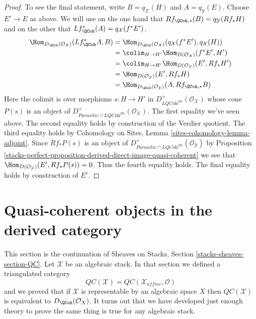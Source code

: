 \begin{proof}
\medskip\noindent
To see the final statement, write $B = q_\mathcal{X}(H)$ and
$A = q_\mathcal{Y}(E)$.
Choose $E' \to E$ as above.
We will use on the one hand that
$Rf_{\QCoh, *}(B) = q_\mathcal{Y}(Rf_*H)$
and on the other that
$Lf^*_\QCoh(A) = q_\mathcal{X}(f^*E')$.
\begin{align*}
\Hom_{D_\QCoh(\mathcal{O}_\mathcal{X})}(Lf^*_\QCoh A, B)
& =
\Hom_{D_\QCoh(\mathcal{O}_\mathcal{X})}(q_\mathcal{X}(f^*E'),
q_\mathcal{X}(H)) \\
& =
\colim_{H \to H'} \Hom_{D(\mathcal{O}_\mathcal{X})}(f^*E', H') \\
& = \colim_{H \to H'} \Hom_{D(\mathcal{O}_\mathcal{Y})}(E', Rf_*H') \\
& = \Hom_{D(\mathcal{O}_\mathcal{Y})}(E', Rf_*H) \\
& =
\Hom_{D_\QCoh(\mathcal{O}_\mathcal{Y})}(A, Rf_{\QCoh, *}B)
\end{align*}
Here the colimit is over morphisms $s : H \to H'$ in
$D^+_{\textit{LQCoh}^{fbc}}(\mathcal{O}_\mathcal{X})$
whose cone $P(s)$ is an object of
$D^+_{\textit{Parasitic} \cap \textit{LQCoh}^{fbc}}(\mathcal{O}_\mathcal{X})$.
The first equality we've seen above.
The second equality holds by construction of the Verdier quotient.
The third equality holds by
Cohomology on Sites, Lemma \ref{sites-cohomology-lemma-adjoint}.
Since $Rf_*P(s)$ is an object of
$D^+_{\textit{Parasitic} \cap \textit{LQCoh}^{fbc}}(\mathcal{O}_\mathcal{Y})$
by
Proposition \ref{stacks-perfect-proposition-derived-direct-image-quasi-coherent}
we see that $\Hom_{D(\mathcal{O}_\mathcal{Y})}(E', Rf_*P(s)) = 0$.
Thus the fourth equality holds. The final equality
holds by construction of $E'$.
\end{proof}

\section{Quasi-coherent objects in the derived category}
\label{stacks-perfect-section-QC}
This section is the continuation of Sheaves on Stacks, Section
\ref{stacks-sheaves-section-QC}. Let $\mathcal{X}$ be an algebraic stack.
In that section we defined a triangulated category
$$
\mathit{QC}(\mathcal{X}) = \mathit{QC}(\mathcal{X}_{affine}, \mathcal{O})
$$
and we proved that if $\mathcal{X}$ is representable by an algebraic space $X$
then $\mathit{QC}(\mathcal{X})$ is equivalent to $D_\QCoh(\mathcal{O}_X)$.
It turns out that we have developed just enough theory to prove the same
thing is true for any algebraic stack.

